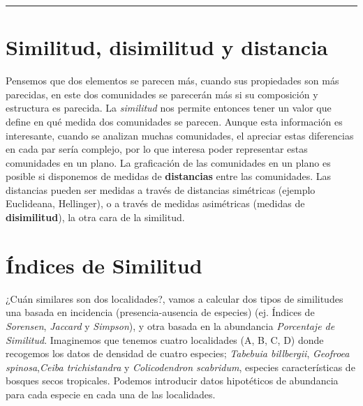 \documentclass[]{book}
\begin{document}
\begin{center}\rule{0.5\linewidth}{\linethickness}\end{center}

\chapter{Similitud, disimilitud y
distancia}\label{similitud-disimilitud-y-distancia}

Pensemos que dos elementos se parecen más, cuando sus propiedades son
más parecidas, en este dos comunidades se parecerán más si su
composición y estructura es parecida. La \emph{similitud} nos permite
entonces tener un valor que define en qué medida dos comunidades se
parecen. Aunque esta información es interesante, cuando se analizan
muchas comunidades, el apreciar estas diferencias en cada par sería
complejo, por lo que interesa poder representar estas comunidades en un
plano. La graficación de las comunidades en un plano es posible si
disponemos de medidas de \textbf{distancias} entre las comunidades. Las
distancias pueden ser medidas a través de distancias simétricas (ejemplo
Euclideana, Hellinger), o a través de medidas asimétricas (medidas de
\textbf{disimilitud}), la otra cara de la similitud.

\chapter{Índices de Similitud}\label{indices-de-similitud}

¿Cuán similares son dos localidades?, vamos a calcular dos tipos de
similitudes una basada en incidencia (presencia-ausencia de especies)
(ej. Índices de \emph{Sorensen}, \emph{Jaccard} y \emph{Simpson}), y
otra basada en la abundancia \emph{Porcentaje de Similitud}. Imaginemos
que tenemos cuatro localidades (A, B, C, D) donde recogemos los datos de
densidad de cuatro especies; \emph{Tabebuia billbergii}, \emph{Geofroea
spinosa},\emph{Ceiba trichistandra} y \emph{Colicodendron scabridum},
especies características de bosques secos tropicales. Podemos introducir
datos hipotéticos de abundancia para cada especie en cada una de las
localidades.
\end{document}
